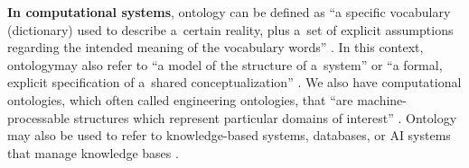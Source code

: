 {{\textbf{In computational systems}, ontology can be defined as ``a specific vocabulary (dictionary) used to describe a~certain reality, plus a~set of explicit assumptions regarding the intended meaning of the vocabulary words''
\parencites[see][]{guarino_ontologies_1995}[][]{guarino_what_2009}. %
 In this context, ontologymay also refer to ``a model of the structure of a~system'' 
\parencite[][]{guarino_what_2009} %
 or ``a formal, explicit specification of a~shared conceptualization'' 
\parencite[][]{studer_knowledge_1998}. %
 We also have computational ontologies, which often called engineering ontologies, that ``are machine-processable structures which represent particular domains of interest'' 
\parencite[][]{husakova_formal_2020}. %
 Ontology may also be used to refer to knowledge-based systems, databases, or AI systems that manage knowledge bases 
\parencites[see the discussions of][]{sharman_ontologies_2007}[][]{staab_handbook_2009}[][]{garbacz_formal_2014}[][]{husakova_formal_2020}.%


}}

